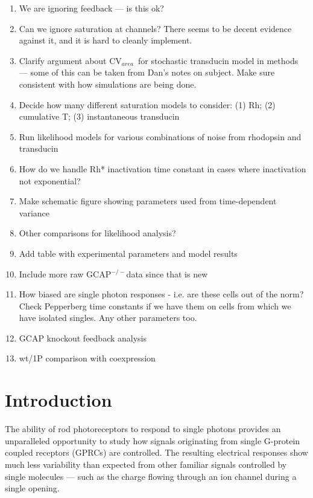 \documentclass[12pt]{article}
\def\i{\item}
\def\be{\begin{enumerate}}
\def\ee{\end{enumerate}}
\def\GCAPKO{GCAP$^{-/-}$}
\def\CVArea{CV$_{area}$~}
\begin{document}
\baselineskip 18pt


\be

\i{We are ignoring feedback --- is this ok?}

\i{Can we ignore saturation at channels?  There seems to be decent evidence against it, and it is hard to cleanly implement.}

\i{Clarify argument about \CVArea for stochastic transducin model in methods --- some of this can be taken from Dan's notes on subject.  Make sure consistent with how simulations are being done.}

\i{Decide how many different saturation models to consider: (1) Rh; (2) cumulative T; (3) instantaneous transducin}

\i{Run likelihood models for various combinations of noise from rhodopsin and transducin}

\i{How do we handle Rh* inactivation time constant in cases where inactivation not exponential?}

\i{Make schematic figure showing parameters used from time-dependent variance}

\i{Other comparisons for likelihood analysis?}

\i{Add table with experimental parameters and model results}

\i{Include more raw \GCAPKO data since that is new}

\i{How biased are single photon responses - i.e. are these cells out of the norm?  Check Pepperberg time constants if we have them on cells from which we have isolated singles.  Any other parameters too.}

\i{GCAP knockout feedback analysis}

\i{wt/1P comparison with coexpression}

\ee


\vfill\eject
\section{Introduction}

The ability of rod photoreceptors to respond to single photons provides an unparalleled opportunity to study how signals originating from single G-protein coupled receptors (GPRCs) are controlled.  The resulting electrical responses show much less variability than expected from other familiar signals controlled by single molecules --- such as the charge flowing through an ion channel during a single opening.  
\end{document}
